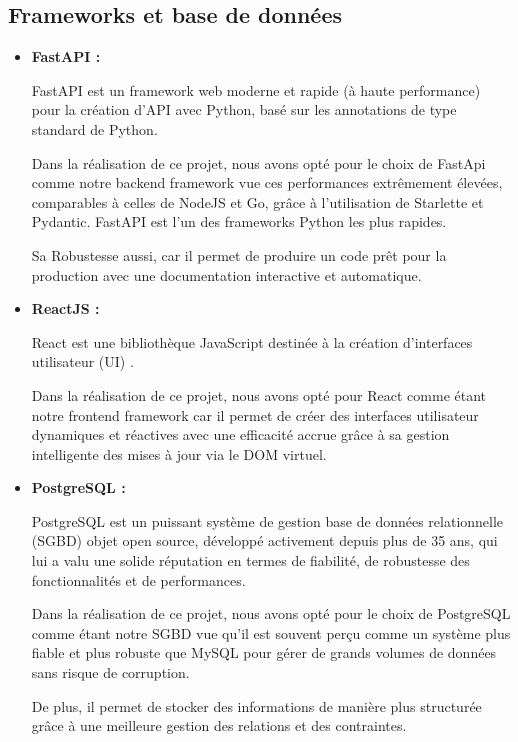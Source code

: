 \subsection{Frameworks et base de données}
    \begin{itemize}
        \item\textbf{FastAPI : }
            \par FastAPI est un framework web moderne et rapide (à haute performance) pour la création d'API avec Python,
            basé sur les annotations de type standard de Python\cite{fastapi}. 
            \par Dans la réalisation de ce projet, nous avons opté pour le choix de FastApi comme notre backend framework vue ces performances extrêmement élevées, comparables à celles de NodeJS et Go, grâce à l'utilisation de Starlette et Pydantic.
            FastAPI est l'un des frameworks Python les plus rapides.
            \par Sa Robustesse aussi, car il permet de produire un code prêt pour la production avec une documentation interactive et automatique.
        \item\textbf{ReactJS : }
                    \par React est une bibliothèque JavaScript destinée à la création d'interfaces utilisateur (UI) \cite{react}. 
                    \par Dans la réalisation de ce projet, nous avons opté pour React comme étant notre frontend framework car il 
                    permet de créer des interfaces utilisateur dynamiques et réactives avec une efficacité accrue grâce à sa gestion 
                    intelligente des mises à jour via le DOM virtuel.
        \item\textbf{PostgreSQL : }
                    \par PostgreSQL est un puissant système de gestion base de données relationnelle (SGBD) objet open source, développé activement depuis plus 
                    de 35 ans, qui lui a valu une solide réputation en termes de fiabilité, de robustesse des fonctionnalités et de performances\cite{pg}. 
                    \par Dans la réalisation de ce projet, nous avons opté pour le choix de PostgreSQL comme étant notre SGBD vue qu'il est souvent perçu comme un 
                    système plus fiable et plus robuste que MySQL pour gérer de grands volumes de données sans risque de corruption.
                    \par De plus, il permet de stocker des informations de manière plus structurée grâce à une meilleure gestion des relations et
                     des contraintes.
                \end{itemize}


